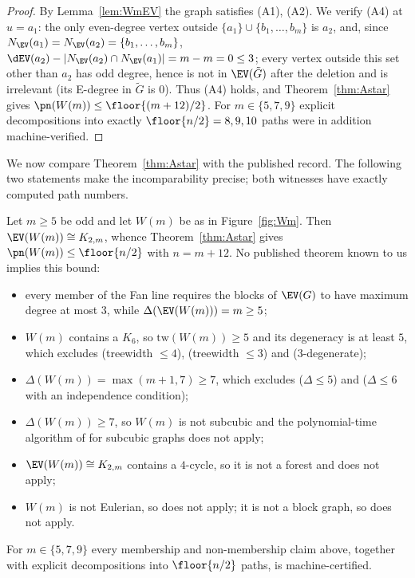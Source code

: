 \begin{proof}
By Lemma~\ref{lem:WmEV} the graph satisfies (A1), (A2). We verify (A4) at $u=a_1$: the only
even-degree vertex outside $\{a_1\}\cup\{b_1,\dots,b_m\}$ is $a_2$, and, since
$N_{\EV}(a_1)=N_{\EV}(a_2)=\{b_1,\dots,b_m\}$,
$\dEV(a_2)-|N_{\EV}(a_2)\cap N_{\EV}(a_1)|=m-m=0\le3$; every vertex outside this set other than
$a_2$ has odd degree, hence is not in $\EV(\tilde G)$ after the deletion and is irrelevant (its
E-degree in $\tilde G$ is $0$). Thus (A4) holds, and
Theorem~\ref{thm:Astar} gives $\pn(W(m))\le\floor{(m+12)/2}$. For $m\in\{5,7,9\}$ explicit
decompositions into exactly $\floor{n/2}=8,9,10$ paths were in addition machine-verified.
\end{proof}

We now compare Theorem~\ref{thm:Astar} with the published record. The following two statements
make the incomparability precise; both witnesses have exactly computed path numbers.

\begin{proposition}[escape]\label{prop:escape}
Let $m\ge5$ be odd and let $W(m)$ be as in Figure~\ref{fig:Wm}. Then $\EV(W(m))\cong K_{2,m}$,
whence Theorem~\ref{thm:Astar} gives $\pn(W(m))\le\floor{n/2}$ with $n=m+12$. No published
theorem known to us implies this bound:
\begin{itemize}[leftmargin=1.5em]
\item every member of the Fan line \cite{Fan05,BS21,FHZ23} requires the blocks of $\EV(G)$ to
have maximum degree at most $3$, while $\Delta(\EV(W(m)))=m\ge5$;
\item $W(m)$ contains a $K_6$, so $\mathrm{tw}(W(m))\ge5$ and its degeneracy is at least $5$,
which excludes \cite{LY24} (treewidth $\le4$), \cite{BCLS20} (treewidth $\le3$) and
\cite{ZLH24} ($3$-degenerate);
\item $\Delta(W(m))=\max(m+1,7)\ge7$, which excludes \cite{BP19} ($\Delta\le5$) and
\cite{CFL} ($\Delta\le6$ with an independence condition);
\item $\Delta(W(m))\ge7$, so $W(m)$ is not subcubic and the polynomial-time algorithm of
\cite{MY26} for subcubic graphs does not apply;
\item $\EV(W(m))\cong K_{2,m}$ contains a $4$-cycle, so it is not a forest and \cite{Pyb96}
does not apply;
\item $W(m)$ is not Eulerian, so \cite{FK88} does not apply; it is not a block graph, so
\cite{CW25} does not apply.
\end{itemize}
For $m\in\{5,7,9\}$ every membership and non-membership claim above, together with explicit
decompositions into $\floor{n/2}$ paths, is machine-certified.
\end{proposition}

